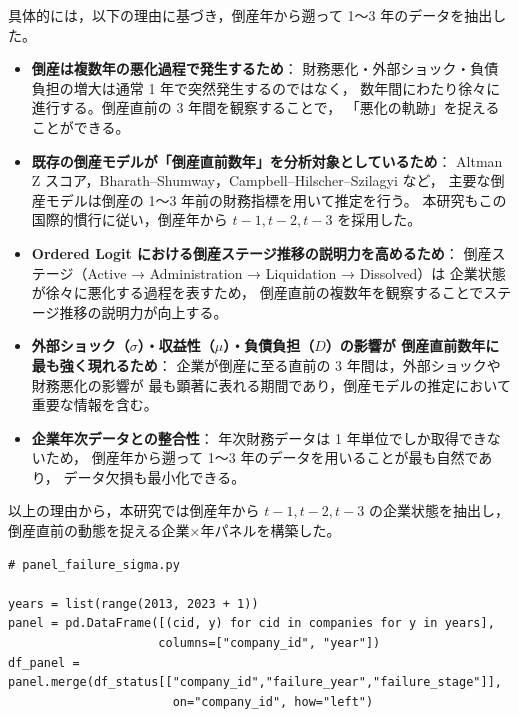 具体的には，以下の理由に基づき，倒産年から遡って 1～3 年のデータを抽出した。

\begin{itemize}
    \item \textbf{倒産は複数年の悪化過程で発生するため}： 
    財務悪化・外部ショック・負債負担の増大は通常 1 年で突然発生するのではなく，
    数年間にわたり徐々に進行する。倒産直前の 3 年間を観察することで，
    「悪化の軌跡」を捉えることができる。

    \item \textbf{既存の倒産モデルが「倒産直前数年」を分析対象としているため}：  
    Altman Z スコア，Bharath–Shumway，Campbell–Hilscher–Szilagyi など，
    主要な倒産モデルは倒産の 1～3 年前の財務指標を用いて推定を行う。
    本研究もこの国際的慣行に従い，倒産年から $t-1, t-2, t-3$ を採用した。

    \item \textbf{Ordered Logit における倒産ステージ推移の説明力を高めるため}：  
    倒産ステージ（Active → Administration → Liquidation → Dissolved）は
    企業状態が徐々に悪化する過程を表すため，
    倒産直前の複数年を観察することでステージ推移の説明力が向上する。

    \item \textbf{外部ショック（$\sigma$）・収益性（$\mu$）・負債負担（$D$）の影響が
    倒産直前数年に最も強く現れるため}：  
    企業が倒産に至る直前の 3 年間は，外部ショックや財務悪化の影響が
    最も顕著に表れる期間であり，倒産モデルの推定において重要な情報を含む。

    \item \textbf{企業年次データとの整合性}：  
    年次財務データは 1 年単位でしか取得できないため，
    倒産年から遡って 1～3 年のデータを用いることが最も自然であり，
    データ欠損も最小化できる。
\end{itemize}

以上の理由から，本研究では倒産年から $t-1, t-2, t-3$ の企業状態を抽出し，
倒産直前の動態を捉える企業×年パネルを構築した。

\begin{verbatim}
# panel_failure_sigma.py

years = list(range(2013, 2023 + 1))
panel = pd.DataFrame([(cid, y) for cid in companies for y in years],
                     columns=["company_id", "year"])
df_panel = panel.merge(df_status[["company_id","failure_year","failure_stage"]],
                       on="company_id", how="left")
\end{verbatim}

